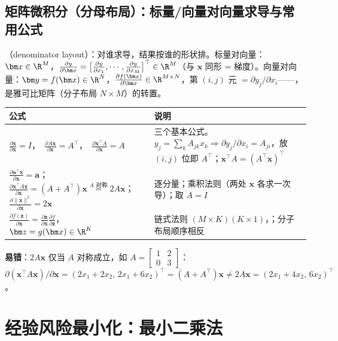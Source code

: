 \subsection{矩阵微积分（分母布局）：标量/向量对向量求导与常用公式}
（denominator layout）：对谁求导，结果按谁的形状排。标量对向量：$\bm x\in\R^M$，$\frac{\partial y}{\partial\bm x}=\big[\frac{\partial y}{\partial x_1},\cdots,\frac{\partial y}{\partial x_M}\big]^\top\in\R^M$（与 $\bm x$ 同形 = 梯度）。向量对向量：$\bm y=f(\bm x)\in\R^N$，$\frac{\partial f(\bm x)}{\partial\bm x}\in\R^{M\times N}$，第 $(i,j)$ 元 $=\partial y_j/\partial x_i$——，是雅可比矩阵（分子布局 $N\times M$）的转置。
\begin{center}\small
\begin{tabularx}{\linewidth}{@{}>{\raggedright\arraybackslash}p{7.2cm}L@{}}
\toprule
公式 & 说明 \\
\midrule
$\frac{\partial\bm x}{\partial\bm x}=I$，\ $\frac{\partial A\bm x}{\partial\bm x}=A^\top$，\ $\frac{\partial\bm x^\top A}{\partial\bm x}=A$ & 三个基本公式。$y_j=\sum_kA_{jk}x_k\Rightarrow\partial y_j/\partial x_i=A_{ji}$，放 $(i,j)$ 位即 $A^\top$；$\bm x^\top A=(A^\top\bm x)^\top$ \\
$\frac{\partial\bm a^\top\bm x}{\partial\bm x}=\bm a$；\ $\frac{\partial\bm x^\top A\bm x}{\partial\bm x}=(A+A^\top)\bm x\overset{A\text{ 对称}}{=}2A\bm x$；\ $\frac{\partial\|\bm x\|^2}{\partial\bm x}=2\bm x$ & 逐分量；乘积法则（两处 $\bm x$ 各求一次导）；取 $A=I$ \\
$\frac{\partial f(\bm z)}{\partial\bm x}=\frac{\partial\bm z}{\partial\bm x}\frac{\partial f}{\partial\bm z}$，$\bm z=g(\bm x)\in\R^K$ & 链式法则 $(M\times K)(K\times1)$，；分子布局顺序相反 \\
\bottomrule
\end{tabularx}
\end{center}
\textbf{易错}：$2A\bm x$ 仅当 $A$ 对称成立，如 $A=\left[\begin{smallmatrix}1&2\\0&3\end{smallmatrix}\right]$：$\partial(\bm x^\top A\bm x)/\partial\bm x=(2x_1+2x_2,\,2x_1+6x_2)^\top=(A+A^\top)\bm x\neq2A\bm x=(2x_1+4x_2,\,6x_2)^\top$。

\section{经验风险最小化：最小二乘法}

